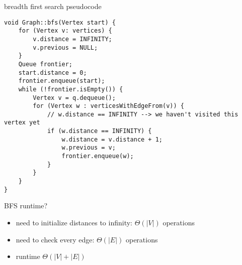 \begin{frame}[fragile,label=bfsPseudo]{breadth first search pseudocode}
\lstset{language=C++,style=small}
\begin{lstlisting}
void Graph::bfs(Vertex start) {
    for (Vertex v: vertices) {
        v.distance = INFINITY;
        v.previous = NULL;
    }
    Queue frontier;
    start.distance = 0;
    frontier.enqueue(start);
    while (!frontier.isEmpty()) {
        Vertex v = q.dequeue();
        for (Vertex w : verticesWithEdgeFrom(v)) {
            // w.distance == INFINITY --> we haven't visited this vertex yet
            if (w.distance == INFINITY) {
                w.distance = v.distance + 1;
                w.previous = v;
                frontier.enqueue(w);
            } 
        }
    }
}
\end{lstlisting}
\end{frame}

\begin{frame}{BFS runtime?}
\begin{itemize}
\item need to initialize distances to infinity: $\Theta(|V|)$ operations
\item need to check every edge: $\Theta(|E|)$ operations
\item runtime $\Theta(|V|+|E|)$
\end{itemize}
\end{frame}
